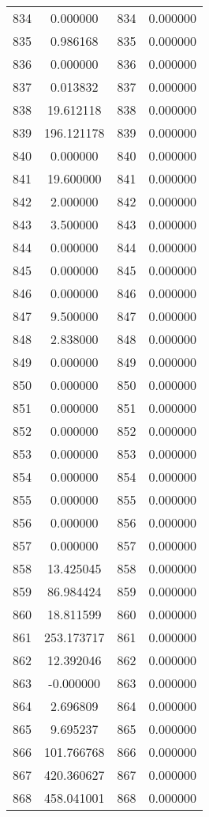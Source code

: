 \documentclass[12pt]{article}
\begin{document}
\begin{longtable}{@{}cccc@{}}
834 & 0.000000 & 834 & 0.000000 \\
835 & 0.986168 & 835 & 0.000000 \\
836 & 0.000000 & 836 & 0.000000 \\
837 & 0.013832 & 837 & 0.000000 \\
838 & 19.612118 & 838 & 0.000000 \\
839 & 196.121178 & 839 & 0.000000 \\
840 & 0.000000 & 840 & 0.000000 \\
841 & 19.600000 & 841 & 0.000000 \\
842 & 2.000000 & 842 & 0.000000 \\
843 & 3.500000 & 843 & 0.000000 \\
844 & 0.000000 & 844 & 0.000000 \\
845 & 0.000000 & 845 & 0.000000 \\
846 & 0.000000 & 846 & 0.000000 \\
847 & 9.500000 & 847 & 0.000000 \\
848 & 2.838000 & 848 & 0.000000 \\
849 & 0.000000 & 849 & 0.000000 \\
850 & 0.000000 & 850 & 0.000000 \\
851 & 0.000000 & 851 & 0.000000 \\
852 & 0.000000 & 852 & 0.000000 \\
853 & 0.000000 & 853 & 0.000000 \\
854 & 0.000000 & 854 & 0.000000 \\
855 & 0.000000 & 855 & 0.000000 \\
856 & 0.000000 & 856 & 0.000000 \\
857 & 0.000000 & 857 & 0.000000 \\
858 & 13.425045 & 858 & 0.000000 \\
859 & 86.984424 & 859 & 0.000000 \\
860 & 18.811599 & 860 & 0.000000 \\
861 & 253.173717 & 861 & 0.000000 \\
862 & 12.392046 & 862 & 0.000000 \\
863 & -0.000000 & 863 & 0.000000 \\
864 & 2.696809 & 864 & 0.000000 \\
865 & 9.695237 & 865 & 0.000000 \\
866 & 101.766768 & 866 & 0.000000 \\
867 & 420.360627 & 867 & 0.000000 \\
868 & 458.041001 & 868 & 0.000000 \\

\end{longtable}
\end{document}

